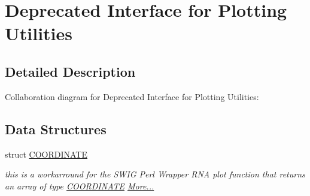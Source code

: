 \hypertarget{group__plotting__utils__deprecated}{}\section{Deprecated Interface for Plotting Utilities}
\label{group__plotting__utils__deprecated}


\subsection{Detailed Description}
Collaboration diagram for Deprecated Interface for Plotting Utilities\+:
\subsection*{Data Structures}
\begin{DoxyCompactItemize}
\item 
struct \mbox{\hyperlink{group__plotting__utils__deprecated_structCOORDINATE}{C\+O\+O\+R\+D\+I\+N\+A\+TE}}
\begin{DoxyCompactList}\small\item\em this is a workarround for the S\+W\+IG Perl Wrapper R\+NA plot function that returns an array of type \mbox{\hyperlink{group__plotting__utils__deprecated_structCOORDINATE}{C\+O\+O\+R\+D\+I\+N\+A\+TE}}  \mbox{\hyperlink{group__plotting__utils__deprecated_structCOORDINATE}{More...}}\end{DoxyCompactList}\end{DoxyCompactItemize}
